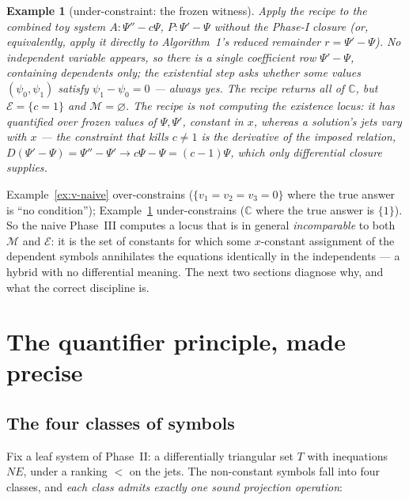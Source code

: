 \documentclass[11pt]{article}
\newcommand{\Psib}{\Psi}
\newcommand{\Mem}{\mathcal{M}}
\newcommand{\Ex}{\mathcal{E}}
\newtheorem{example}{Example}
\begin{document}
\begin{example}[under-constraint: the frozen witness]
\label{ex:frozen}
Apply the recipe to the combined toy system $A: \Psib''-c\Psib$,
$P: \Psib'-\Psib$ \emph{without} the Phase-I closure (or, equivalently, apply
it directly to Algorithm~1's reduced remainder $r = \Psib'-\Psib$). No
independent variable appears, so there is a single coefficient row
$\Psib'-\Psib$, containing dependents only; the existential step asks whether
\emph{some} values $(\psi_0,\psi_1)$ satisfy $\psi_1-\psi_0 = 0$ --- always
yes. The recipe returns all of $\mathbb{C}$, but $\Ex = \{c=1\}$ and
$\Mem = \varnothing$. The recipe is not computing the existence locus: it has
quantified over \emph{frozen} values of $\Psib,\Psib'$, constant in $x$,
whereas a solution's jets vary with $x$ --- the constraint that kills
$c \ne 1$ is the \emph{derivative} of the imposed relation,
$D(\Psib'-\Psib) = \Psib''-\Psib' \to c\Psib - \Psib = (c-1)\Psib$, which
only differential closure supplies.
\end{example}

Example~\ref{ex:v-naive} over-constrains ($\{v_1=v_2=v_3=0\}$ where the true
answer is ``no condition''); Example~\ref{ex:frozen} under-constrains
($\mathbb{C}$ where the true answer is $\{1\}$). So the naive Phase~III
computes a locus that is in general \emph{incomparable} to both $\Mem$ and
$\Ex$: it is the set of constants for which some $x$-constant assignment of
the dependent symbols annihilates the equations identically in the
independents --- a hybrid with no differential meaning. The next two sections
diagnose why, and what the correct discipline is.

\section{The quantifier principle, made precise}
\label{sec:quantifier}

\subsection{The four classes of symbols}

Fix a leaf system of Phase~II: a differentially triangular set $T$ with
inequations $NE$, under a ranking $<$ on the jets. The non-constant symbols
fall into four classes, and \emph{each class admits exactly one sound
projection operation}:
\end{document}
